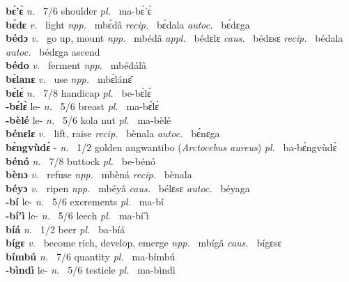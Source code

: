 {\bfseries bɛ̀'ɛ̀}  {\itshape n.~} 7/6 shoulder {\itshape pl.~} ma-bɛ̀'ɛ̀    \\ 
{\bfseries bɛ́dɛ}  {\itshape v.~} light   {\itshape npp.~} mbɛ́dâ {\itshape recip.~} bɛ́dala {\itshape autoc.~} bɛ́dɛga  \\ 
{\bfseries bédɔ}  {\itshape v.~} go up, mount   {\itshape npp.~} mbédâ {\itshape appl.~} bédɛlɛ {\itshape caus.~} bédɛsɛ {\itshape recip.~} bédala {\itshape autoc.~} bédɛga ascend  \\ 
{\bfseries bédo}  {\itshape v.~} ferment   {\itshape npp.~} mbédálâ  \\ 
{\bfseries bɛ̀lanɛ}  {\itshape v.~} use   {\itshape npp.~} mbɛ̀lánɛ̂ \\ 
{\bfseries bɛ́lɛ́}  {\itshape n.~} 7/8 handicap {\itshape pl.~} be-bɛ́lɛ́    \\ 
{\bfseries -bɛ́lɛ̀} le- {\itshape n.~} 5/6 breast {\itshape pl.~} ma-bɛ́lɛ̀    \\ 
{\bfseries -bèlé} le- {\itshape n.~} 5/6 kola nut {\itshape pl.~} ma-bèlé    \\ 
{\bfseries bénɛlɛ}  {\itshape v.~} lift, raise   {\itshape recip.~} bènala {\itshape autoc.~} bɛ́nɛga  \\ 
{\bfseries bɛ̀ngvùdɛ̀} - {\itshape n.~} 1/2 golden angwantibo ({\itshape Arctocebus aureus}) {\itshape pl.~} ba-bɛ̀ngvùdɛ̀    \\ 
{\bfseries bénó}  {\itshape n.~} 7/8 buttock {\itshape pl.~} be-bénó    \\ 
{\bfseries bènɔ}  {\itshape v.~} refuse   {\itshape npp.~} mbèná {\itshape recip.~} bènala  \\ 
{\bfseries béyɔ}  {\itshape v.~} ripen   {\itshape npp.~} mbéyâ {\itshape caus.~} bélɛsɛ {\itshape autoc.~} béyaga  \\ 
{\bfseries -bí} le- {\itshape n.~} 5/6 excrements {\itshape pl.~} ma-bí    \\ 
{\bfseries -bí'ì} le- {\itshape n.~} 5/6 leech {\itshape pl.~} ma-bí'ì    \\ 
{\bfseries bíá}  {\itshape n.~} 1/2 beer {\itshape pl.~} ba-bíá    \\ 
{\bfseries bígɛ}  {\itshape v.~} become rich, develop, emerge   {\itshape npp.~} mbígâ {\itshape caus.~} bígɛsɛ  \\ 
{\bfseries bímbú}  {\itshape n.~} 7/6 quantity {\itshape pl.~} ma-bímbú    \\ 
{\bfseries -bìndì} le- {\itshape n.~} 5/6 testicle {\itshape pl.~} ma-bìndì    \\ 
